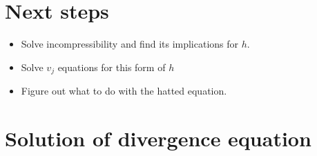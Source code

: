 \documentclass[10pt,a4paper]{article}
\begin{document}
\appendix

\section{Next steps}

\begin{itemize}
\item Solve incompressibility and find its implications for $h$.
\item Solve $v_j$ equations for this form of $h$
\item Figure out what to do with the hatted equation.
\end{itemize}

\section{Solution of divergence equation}
\end{document}
